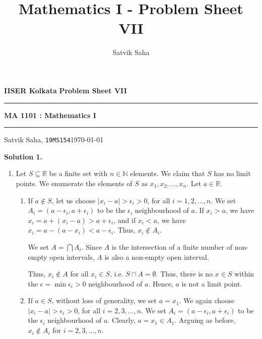 \documentclass[10pt]{article}
\title{Mathematics I - Problem Sheet VII}
\author{Satvik Saha}
\date{}
\begin{document}
        \par\textbf{IISER Kolkata} \hfill \textbf{Problem Sheet VII}
        \vspace{3pt}
        \hrule
        \vspace{3pt}
        \begin{center}
                \LARGE{\textbf{MA 1101 : Mathematics I}}
        \end{center}
        \vspace{3pt}
        \hrule
        \vspace{3pt}
        Satvik Saha, \texttt{19MS154}\hfill\today
        \vspace{20pt}

        \textbf{Solution 1.}
        \begin{enumerate}
                \item Let $S \subseteq \mathbb{R}$ be a finite set with $n \in \mathbb{N}$ elements.
                We claim that $S$ has no limit points.
                We enumerate the elements of $S$ as $x_1, x_2, \dotsc, x_n$.
                Let $a \in \mathbb{R}$.

                \begin{enumerate}
                \item   If $a \notin S$, let us choose $|x_i - a| > \epsilon_i > 0$, for all $i = 1,2,\dotsc,n$.
                        We set $A_i = (a - \epsilon_i, a + \epsilon_i)$ to be the $\epsilon_i$ neighbourhood of $a$.
                        If $x_i > a$, we have $x_i = a + (x_i - a)> a + \epsilon_i$, and if $x_i < a$, we have $x_i = a - (a - x_i) < a - \epsilon_i$.
                        Thus, $x_i \notin A_i$.

                        We set $A = \bigcap A_i$.
                        Since $A$ is the intersection of a finite number of non-empty open intervals, $A$ is also a non-empty open interval.

                        Thus, $x_i \notin A$ for all $x_i \in S$, i.e. $S \cap A = \emptyset$.
                        Thus, there is no $x \in S$ within the $\epsilon = \min \epsilon_i > 0$ neighbourhood of $a$.
                        Hence, $a$ is not a limit point.
                \item   If $a \in S$, without loss of generality, we set $a = x_1$.
                        We again choose $|x_i - a| > \epsilon_i > 0$, for all $i = 2,3,\dotsc,n$.
                        We set $A_i = (a - \epsilon_i, a + \epsilon_i)$ to be the $\epsilon_i$ neighbourhood of $a$.
                        Clearly, $a = x_1 \in A_1$.
                        Arguing as before, $x_i \notin A_i$ for $i = 2,3,\dotsc,n$.


\end{enumerate}
\end{enumerate}
\end{document}
